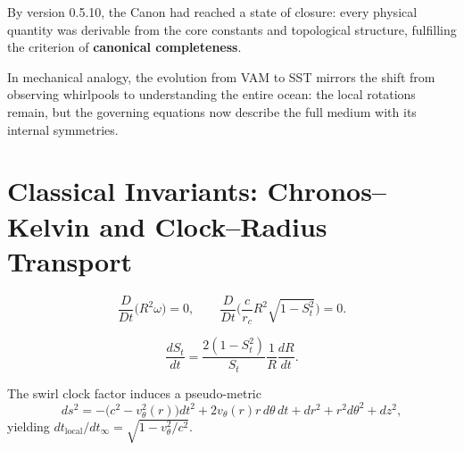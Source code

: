 \documentclass[10pt,reprint,aps,onecolumn,nofootinbib]{revtex4-2}
\begin{document}
        By version 0.5.10, the Canon had reached a state of closure: every physical quantity was derivable from the core constants and topological structure, fulfilling the criterion of \textbf{canonical completeness}.

        \begin{tcolorbox}[colback=gray!5,colframe=black,title={Summary Analogy}]
        In mechanical analogy, the evolution from VAM to SST mirrors the shift from observing whirlpools to understanding the entire ocean: the local rotations remain, but the governing equations now describe the full medium with its internal symmetries.
        \end{tcolorbox}

  



    \section{Classical Invariants: Chronos--Kelvin and Clock--Radius Transport}\label{canon58:classical-invariants}
    \begin{tcolorbox}[title=Axiom: Chronos--Kelvin Invariant]
    \label{canon58:CK}
    \[
        \frac{D}{Dt}\big(R^2\omega\big)=0,
        \qquad
        \frac{D}{Dt}\Big(\frac{c}{r_c}R^2\sqrt{1-S_t^2}\Big)=0.
    \]
    \end{tcolorbox}
    \begin{tcolorbox}[title=Corollary: Clock--Radius Transport]
    \label{canon58:clock-transport}
    \[
        \frac{dS_t}{dt} = \frac{2(1-S_t^2)}{S_t}\frac{1}{R}\frac{dR}{dt}.
    \]
    \end{tcolorbox}
    \begin{tcolorbox}[title=Remark (Pseudo-metric)]
    The swirl clock factor induces a pseudo-metric
    \[
        ds^2 = -\big(c^2 - v_\theta^2(r)\big)dt^2 + 2v_\theta(r)r\,d\theta\,dt + dr^2 + r^2 d\theta^2 + dz^2,
    \]
    yielding $dt_{\text{local}}/dt_\infty = \sqrt{1 - v_\theta^2/c^2}$. %
    \end{tcolorbox}
\end{document}
